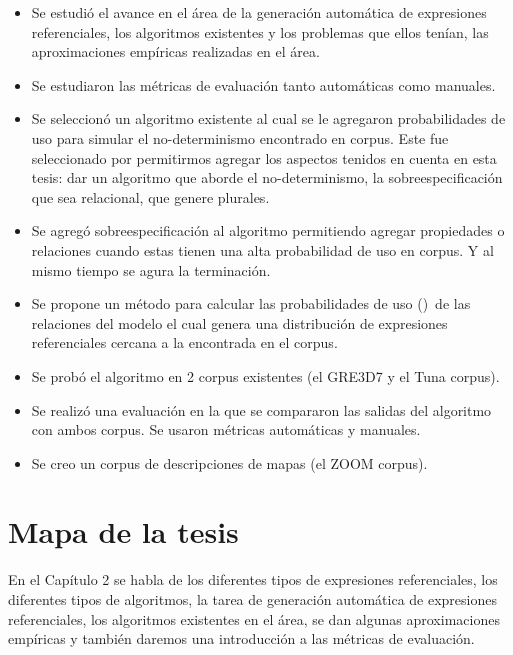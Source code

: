 \begin{itemize}
\item Se estudi\'o el avance en el \'area de la generaci\'on autom\'atica de expresiones referenciales, los algoritmos existentes y los problemas que ellos ten\'ian, las aproximaciones emp\'iricas realizadas en el \'area.
\item Se estudiaron las m\'etricas de evaluaci\'on tanto autom\'aticas como manuales.
\item Se seleccion\'o un algoritmo existente al cual se le agregaron probabilidades de uso para simular el no-determinismo encontrado en corpus. Este fue seleccionado por permitirmos agregar los aspectos tenidos en cuenta en esta tesis: dar un algoritmo que aborde el no-determinismo, la sobreespecificaci\'on que sea relacional, que genere plurales.
\item Se agreg\'o sobreespecificaci\'on al algoritmo permitiendo agregar propiedades o relaciones cuando estas tienen una alta probabilidad de uso en corpus. Y al mismo tiempo se agura la terminaci\'on.
\item Se propone un m\'etodo para calcular las probabilidades de uso (\puse)\ de las relaciones del modelo el cual genera una distribuci\'on de expresiones referenciales cercana a la encontrada en el corpus.
\item Se prob\'o el algoritmo en 2 corpus existentes (el GRE3D7 y el Tuna corpus).
\item Se realiz\'o una evaluaci\'on en la que se compararon las salidas del algoritmo con ambos corpus. Se usaron m\'etricas autom\'aticas y manuales.
\item Se creo un corpus de descripciones de mapas (el ZOOM corpus).
\end{itemize}

\section{Mapa de la tesis}
\label{sec:mapadetesis}

En el Cap\'itulo 2 se habla de los diferentes tipos de expresiones referenciales, los diferentes tipos de algoritmos, la tarea de generaci\'on autom\'atica de expresiones referenciales, los algoritmos existentes en el \'area, se dan algunas aproximaciones emp\'iricas y tambi\'en daremos una introducci\'on a las m\'etricas de evaluaci\'on. 

